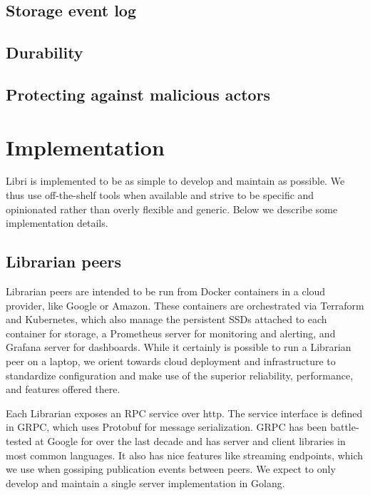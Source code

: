 \documentclass[10pt]{article}
\begin{document}
\subsection{Storage event log}

\subsection{Durability}

\subsection{Protecting against malicious actors}

\section{Implementation}

Libri is implemented to be as simple to develop and maintain as possible. We thus use off-the-shelf tools when available and strive to be specific and opinionated rather than overly flexible and generic. Below we describe some implementation details. 


\subsection{Librarian peers}
Librarian peers are intended to be run from Docker containers in a cloud provider, like Google or Amazon. These containers are orchestrated via Terraform and Kubernetes, which also manage the persistent SSDs attached to each container for storage, a Prometheus server for monitoring and alerting, and Grafana server for dashboards. While it certainly is possible to run a Librarian peer on a laptop, we orient towards cloud deployment and infrastructure to standardize configuration and make use of the superior reliability, performance, and features offered there. 

Each Librarian exposes an RPC service over http. The service interface is defined in GRPC, which uses Protobuf for message serialization. GRPC has been battle-tested at Google for over the last decade and has server and client libraries in most common languages. It also has nice features like streaming endpoints, which we use when gossiping publication events between peers. We expect to only develop and maintain a single server implementation in Golang. 
\end{document}
